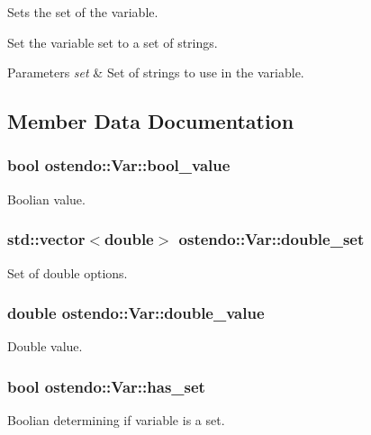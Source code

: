 Sets the set of the variable. 

Set the variable set to a set of strings. 
\begin{DoxyParams}{Parameters}
{\em set} & Set of strings to use in the variable. \\
\hline
\end{DoxyParams}


\subsection{Member Data Documentation}
\subsubsection[{\texorpdfstring{bool\+\_\+value}{bool_value}}]{\setlength{\rightskip}{0pt plus 5cm}bool ostendo\+::\+Var\+::bool\+\_\+value}\hypertarget{structostendo_1_1Var_ad99e4f66f5e7ae44aa4bdd7f1a4e9f79}{}\label{structostendo_1_1Var_ad99e4f66f5e7ae44aa4bdd7f1a4e9f79}
Boolian value. 
\subsubsection[{\texorpdfstring{double\+\_\+set}{double_set}}]{\setlength{\rightskip}{0pt plus 5cm}std\+::vector$<$double$>$ ostendo\+::\+Var\+::double\+\_\+set}\hypertarget{structostendo_1_1Var_a78ebcf6a3207f950286c6188cb97359c}{}\label{structostendo_1_1Var_a78ebcf6a3207f950286c6188cb97359c}
Set of double options. 
\subsubsection[{\texorpdfstring{double\+\_\+value}{double_value}}]{\setlength{\rightskip}{0pt plus 5cm}double ostendo\+::\+Var\+::double\+\_\+value}\hypertarget{structostendo_1_1Var_a034ed342b05d98766cc628974ab4a0f5}{}\label{structostendo_1_1Var_a034ed342b05d98766cc628974ab4a0f5}
Double value. 
\subsubsection[{\texorpdfstring{has\+\_\+set}{has_set}}]{\setlength{\rightskip}{0pt plus 5cm}bool ostendo\+::\+Var\+::has\+\_\+set}\hypertarget{structostendo_1_1Var_a2ad63d508b2a224a9cc14479e5b1047a}{}\label{structostendo_1_1Var_a2ad63d508b2a224a9cc14479e5b1047a}
Boolian determining if variable is a set. 
